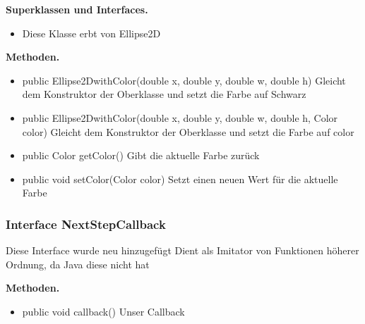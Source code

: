 \documentclass{article}
\begin{document}
	    \textbf{Superklassen und Interfaces.}\newline
	   \begin{itemize}
            \item Diese Klasse erbt von Ellipse2D\newline
           \end{itemize}

    \textbf{Methoden.}\newline
	   \begin{itemize}
           \item public Ellipse2DwithColor(double x, double y, double w, double h) \newline
               Gleicht dem Konstruktor der Oberklasse und setzt die Farbe auf Schwarz\newline
           \item public Ellipse2DwithColor(double x, double y, double w, double h, Color color) \newline
               Gleicht dem Konstruktor der Oberklasse und setzt die Farbe auf color\newline
           \item public Color getColor() \newline
               Gibt die aktuelle Farbe zurück\newline
           \item public void setColor(Color color) \newline
               Setzt einen neuen Wert für die aktuelle Farbe\newline
           \end{itemize}

	\subsubsection{Interface NextStepCallback}
    Diese Interface wurde neu hinzugefügt\newline
    Dient als Imitator von Funktionen höherer Ordnung,\newline
    da Java diese nicht hat\newline

    \textbf{Methoden.}\newline
	   \begin{itemize}
           \item public void callback() \newline
               Unser Callback\newline
           \end{itemize}
\end{document}
